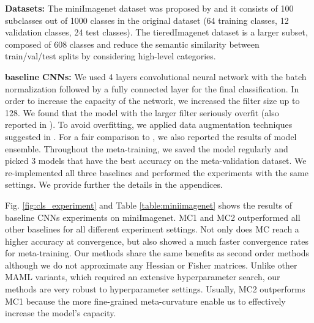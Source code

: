 \documentclass{article}
\begin{document}
\textbf{Datasets:} The miniImagenet dataset was proposed by \cite{matchingnet,Ravi-iclr-2017} and it consists of 100 subclasses out of 1000 classes in the original dataset (64 training classes, 12 validation classes, 24 test classes). The tieredImagenet dataset \cite{ren-iclr18} is a larger subset, composed of 608 classes and reduce the semantic similarity between train/val/test splits by considering high-level categories.

\textbf{baseline CNNs:} We used 4 layers convolutional neural network with the batch normalization followed by a fully connected layer for the final classification. In order to increase the capacity of the network, we increased the filter size up to 128. We found that the model with the larger filter seriously overfit (also reported in \cite{Finn-icml-2017}). To avoid overfitting, we applied data augmentation techniques suggested in \cite{autoaugment, cutout}. For a fair comparison to \cite{Antoniou-arxiv-2018}, we also reported the results of model ensemble. Throughout the meta-training, we saved the model regularly and picked 3 models that have the best accuracy on the meta-validation dataset. We re-implemented all three baselines and performed the experiments with the same settings. We provide further the details in the appendices.

Fig. \ref{fig:cls_experiment} and Table \ref{table:miniimagenet} shows the results of baseline CNNs experiments on miniImagenet. MC1 and MC2 outperformed all other baselines for all different experiment settings. Not only does MC reach a higher accuracy at convergence, but also showed a much faster convergence rates for meta-training. Our methods share the same benefits as second order methods although we do not approximate any Hessian or Fisher matrices. Unlike other MAML variants, which required an extensive hyperparameter search, our methods are very robust to hyperparameter settings. Usually, MC2 outperforms MC1 because the more fine-grained meta-curvature enable us to effectively increase the model's capacity.
\end{document}
